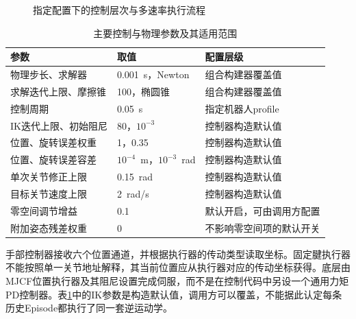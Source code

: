 \begin{figure}[htbp]
  \centering
  \caption{指定配置下的控制层次与多速率执行流程}
  \label{fig:ch02_control}
\end{figure}

\begin{table}[htbp]
  \centering\small
  \caption{主要控制与物理参数及其适用范围}
  \label{tab:ch02_control_parameters}
  \begin{tabular}{p{}p{}p{}}
    \hline
    参数 & 取值 & 配置层级\\
    \hline
    物理步长、求解器 & 0.001~s，Newton & 组合构建器覆盖值\\
    求解迭代上限、摩擦锥 & 100，椭圆锥 & 组合构建器覆盖值\\
    控制周期 & 0.05~s & 指定机器人profile\\
    IK迭代上限、初始阻尼 & 80，$10^{-3}$ & 控制器构造默认值\\
    位置、旋转误差权重 & 1，0.35 & 控制器构造默认值\\
    位置、旋转误差容差 & $10^{-4}$~m，$10^{-3}$~rad & 控制器构造默认值\\
    单次关节修正上限 & 0.15~rad & 控制器构造默认值\\
    目标关节速度上限 & 2~rad/s & 控制器构造默认值\\
    零空间调节增益 & 0.1 & 默认开启，可由调用方配置\\
    附加姿态残差权重 & 0 & 不影响零空间项的默认开关\\
    \hline
  \end{tabular}
\end{table}

手部控制器接收六个位置通道，并根据执行器的传动类型读取坐标。固定腱执行器不能按照单一关节地址解释，其当前位置应从执行器对应的传动坐标获得。底层由MJCF位置执行器及其阻尼设置完成伺服，而不是在控制代码中另设一个通用力矩PD控制器\cite{mujoco2026xml}。表\ref{tab:ch02_control_parameters}中的IK参数是构造默认值，调用方可以覆盖，不能据此认定每条历史Episode都执行了同一套逆运动学。

